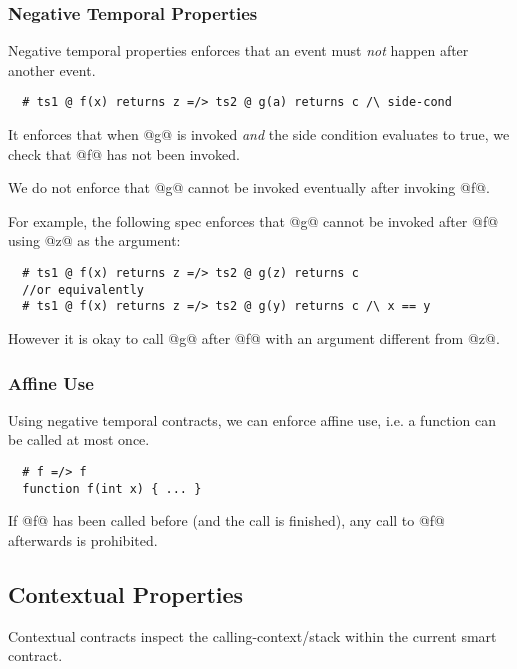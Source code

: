 
\subsubsection{Negative Temporal Properties}

Negative temporal properties enforces that an event must \emph{not}
happen after another event.

\begin{lstlisting}
  # ts1 @ f(x) returns z =/> ts2 @ g(a) returns c /\ side-cond
\end{lstlisting}
It enforces that when @g@ is invoked \emph{and} the side condition
evaluates to true, we check that @f@ has not been invoked.

We do not enforce that @g@ cannot be invoked eventually
after invoking @f@.

For example, the following spec enforces that @g@ cannot be
invoked after @f@ using @z@ as the argument:
\begin{lstlisting}
  # ts1 @ f(x) returns z =/> ts2 @ g(z) returns c
  //or equivalently
  # ts1 @ f(x) returns z =/> ts2 @ g(y) returns c /\ x == y
\end{lstlisting}
However it is okay to call @g@ after @f@ with an argument different from @z@.

\subsubsection*{Affine Use}

Using negative temporal contracts, we can enforce affine use, i.e.
a function can be called at most once.
\begin{lstlisting}
  # f =/> f
  function f(int x) { ... }
\end{lstlisting}
If @f@ has been called before (and the call is finished), any
call to @f@ afterwards is prohibited.



\subsection{Contextual Properties}

Contextual contracts inspect the calling-context/stack within the
current smart contract.

